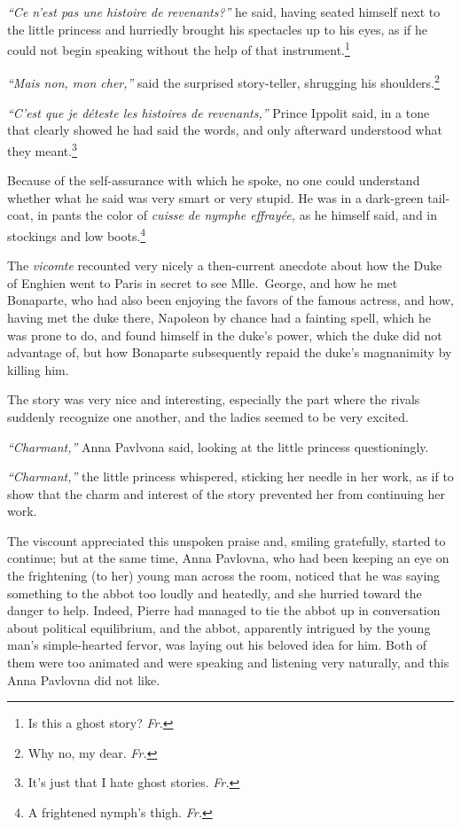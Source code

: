 \textit{``Ce n'est pas une histoire de revenants?''} he said, having seated himself next to the little princess and hurriedly brought his spectacles up to his eyes, as if he could not begin speaking without the help of that instrument.\footnote{Is this a ghost story? \textit{Fr.}} %

\textit{``Mais non, mon cher,''} said the surprised story-teller, shrugging his shoulders.\footnote{Why no, my dear. \textit{Fr.}} %

\textit{``C'est que je d\'eteste les histoires de revenants,''} Prince Ippolit said, in a tone that clearly showed he had said the words, and only afterward understood what they meant.\footnote{It's just that I hate ghost stories. \textit{Fr.}} %

Because of the self-assurance with which he spoke, no one could understand whether what he said was very smart or very stupid. He was in a dark-green tail-coat, in pants the color of \textit{cuisse de nymphe effray\'ee,} as he himself said, and in stockings and low boots.\footnote{A frightened nymph's thigh. \textit{Fr.}}

The \textit{vicomte} recounted very nicely a then-current anecdote about how the Duke of Enghien went to Paris in secret to see Mlle.~George, and how he met Bonaparte, who had also been enjoying the favors of the famous actress, and how, having met the duke there, Napoleon by chance had a fainting spell, which he was prone to do, and found himself in the duke's power, which the duke did not advantage of, but how Bonaparte subsequently repaid the duke's magnanimity by killing him.

The story was very nice and interesting, especially the part where the rivals suddenly recognize one another, and the ladies seemed to be very excited.

\textit{``Charmant,''} Anna Pavlvona said, looking at the little princess questioningly. %

\textit{``Charmant,''} the little princess whispered, sticking her needle in her work, as if to show that the charm and interest of the story prevented her from continuing her work. %

The viscount appreciated this unspoken praise and, smiling gratefully, started to continue; but at the same time, Anna Pavlovna, who had been keeping an eye on the frightening (to her) young man across the room, noticed that he was saying something to the abbot too loudly and heatedly, and she hurried toward the danger to help. Indeed, Pierre had managed to tie the abbot up in conversation about political equilibrium, and the abbot, apparently intrigued by the young man's simple-hearted fervor, was laying out his beloved idea for him. Both of them were too animated and were speaking and listening very naturally, and this Anna Pavlovna did not like.

